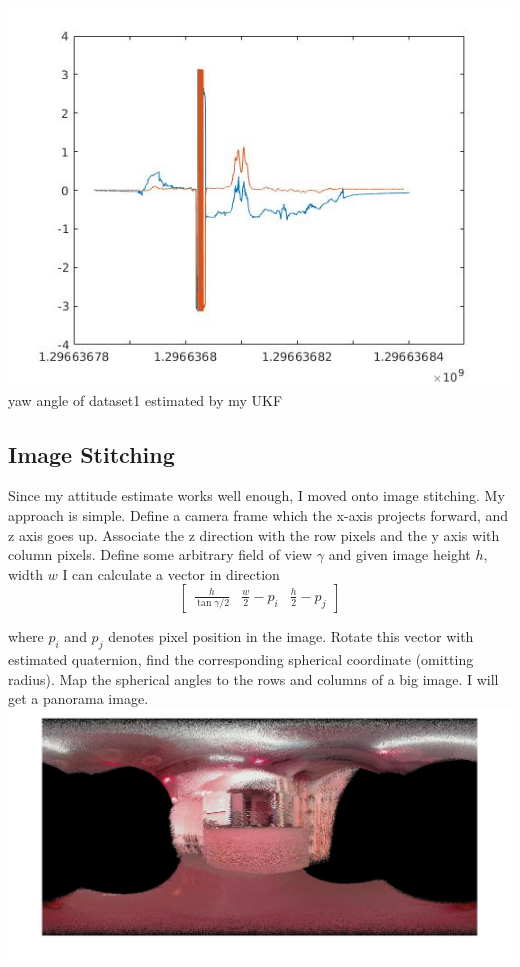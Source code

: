 \documentclass[english]{article}
\begin{document}
\includegraphics[scale = 0.7]{yaw_kalman1.jpg}\\
yaw angle of dataset1 estimated by my UKF\\
\subsection*{Image Stitching}
Since my attitude estimate works well enough, I moved onto image stitching. My approach is simple. Define a camera frame which the x-axis projects forward, and z axis goes up. Associate the z direction with the row pixels and the y axis with column pixels. Define some arbitrary field of view $\gamma$ and given image height $h$, width $w$ I can calculate a vector in direction 
\[\begin{bmatrix}
\frac{h}{\tan{\gamma/2}} & \frac{w}{2} - p_i & \frac{h}{2} - p_j
\end{bmatrix}\]

where $p_i$ and $p_j$ denotes pixel position in the image. Rotate this vector with estimated quaternion, find the corresponding spherical coordinate (omitting radius). Map the spherical angles to the rows and columns of a big image. I will get a panorama image.\\

\includegraphics[scale=0.3]{backbackray.jpg}
\end{document}
